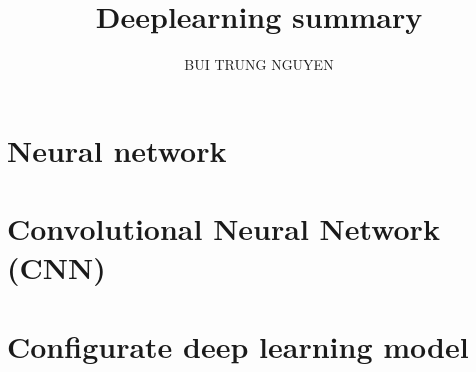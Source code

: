 \documentclass[hidelink,12pt]{report}
\author{BUI TRUNG NGUYEN}
\affil{Sorbonne Paris Nord University}
\title{Deeplearning summary}
\begin{document}
\maketitle
\pagestyle{fancy}
\tableofcontents
\newpage

\chapter{Neural network}


\chapter{Convolutional Neural Network (CNN)}


\chapter{Configurate deep learning model }



\end{document}

